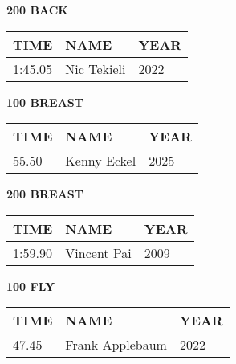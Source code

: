 \begin{table}[H]
\centering
\begin{minipage}[t]{0.48\textwidth}
\centering
\textbf{200 BACK}\\[0.1cm]
\begin{tabular}{@{}p{1.8cm}p{2.8cm}p{1.2cm}@{}}
\hline
    \textbf{TIME} & \textbf{NAME} & \textbf{YEAR} \\
\hline
    1:45.05 & Nic Tekieli & 2022 \\
\hline
\end{tabular}
\end{minipage}\hfill
\begin{minipage}[t]{0.48\textwidth}
\centering
\textbf{100 BREAST}\\[0.1cm]
\begin{tabular}{@{}p{1.8cm}p{2.8cm}p{1.2cm}@{}}
\hline
    \textbf{TIME} & \textbf{NAME} & \textbf{YEAR} \\
\hline
    55.50 & Kenny Eckel & 2025 \\
\hline
\end{tabular}
\end{minipage}
\end{table}

\begin{table}[H]
\centering
\begin{minipage}[t]{0.48\textwidth}
\centering
\textbf{200 BREAST}\\[0.1cm]
\begin{tabular}{@{}p{1.8cm}p{2.8cm}p{1.2cm}@{}}
\hline
    \textbf{TIME} & \textbf{NAME} & \textbf{YEAR} \\
\hline
    1:59.90 & Vincent Pai & 2009 \\
\hline
\end{tabular}
\end{minipage}\hfill
\begin{minipage}[t]{0.48\textwidth}
\centering
\textbf{100 FLY}\\[0.1cm]
\begin{tabular}{@{}p{1.8cm}p{2.8cm}p{1.2cm}@{}}
\hline
    \textbf{TIME} & \textbf{NAME} & \textbf{YEAR} \\
\hline
    47.45 & Frank Applebaum & 2022 \\
\hline
\end{tabular}
\end{minipage}
\end{table}

